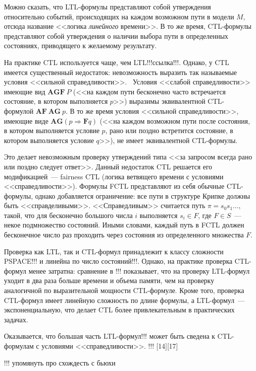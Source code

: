 \documentclass[a4paper,notitlepage,14pt]{article}
\begin{document}
Можно сказать, что LTL-формулы представляют собой утверждения относительно событий,
происходящих на каждом возможном пути в модели $M$, отсюда название <<логика
\emph{линейного} времени>>. В то же время, CTL-формулы представляют собой утверждения о
наличии выбора пути в определенных состояниях, приводящего к желаемому
результату.~\cite{Clarke}

На практике CTL используется чаще, чем LTL!!!ссылка!!!. Однако, у CTL имеется существенный
недостаток: невозможность выразить так называемые условия <<сильной
справедливости>>.~\cite{Katoen,DBLP:conf/spin/FaragoS09} Условия <<слабой справедливости>>
имеющие вид $\mathbf{AGF}~P$ (<<на каждом пути бесконечно часто встречается состояние, в
котором выполняется $p$>>) выразимы эквивалентной CTL-формулой $\mathbf{AF~AG}~p$. В то же
время условия <<сильной справедливости>>, имеющие виде $\mathbf{AG} (p \Rightarrow
\mathbf{F} q)$ (<<на каждом возможном пути после состояния, в котором выполняется условие
$p$, рано или поздно встретится состояние, в котором выполняется условие $q$>>), не имеет
эквивалентной CTL-формулы.

Это делает невозможным проверку утверждений типа <<за запросом всегда рано или поздно
следует ответ>>. Данный недостаток CTL решается его модификацией~--- fairness CTL (логика
ветвящего времени с условиями <<справедливости>>). Формулы FCTL представляют из себя
обычные CTL-формулы, однако добавляется ограничение: все пути в структуре Крипке должны
быть <<справделивыми>>. <<Справедливым>> считается путь $\pi = s_0s_1\ldots$, такой, что
для бесконечно большого числа $i$ выполняется $s_i \in F$, где $F \in S$~--- некое
подмножество состояний. Иными словами, каждый путь в FCTL должен бесконечное число раз
проходить через состояния из определенного множества $F$.

Проверка как LTL, так и CTL-формул принадлежит к классу сложности PSPACE!!! и линейна по
число состояний!!!. Однако, на практике проверка CTL-формул менее затратна: сравнение в
!!! показывает, что на проверку LTL-формул уходит в два раза больше времени и объема
памяти, чем на проверку аналогичной по выразительной мощности CTL-формуле. Кроме того,
проверка CTL-формул имеет линейную сложность по длине формулы, а LTL-формул~---
экспоненциальную, что делает CTL более привлекательным в практических задачах.

Оказывается, что большая часть LTL-формул!!! может быть сведена к CTL-формулам с условиями
<<справедливости>>.
!!! [14][17]

!!! упомянуть про схождесть с бьюхи
\end{document}
